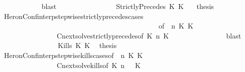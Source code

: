\begin{isabellebody}
\ \ \ \ \ \ \ \ \ \ \isamarkupfalse%
\ blast\isanewline
\ \ \ \ \ \ \isamarkupfalse%
\isanewline
\ \ \ \ \ \ \ \ \isamarkupfalse%
\ {\isacharparenleft}StrictlyPrecedes\ K{}\ K{}{\isacharparenright}\ \ \isamarkupfalse%
\ {\isacharquery}thesis\isanewline
\ \ \ \ \ \ \ \ \ \ \isamarkupfalse%
\ HeronConf{\isacharunderscore}interp{\isacharunderscore}stepwise{\isacharunderscore}strictly{\isacharunderscore}precedes{\isacharunderscore}cases\isanewline
\ \ \ \ \ \ \ \ \ \ \ \ \ \ \ \ \ \ \ \ \ \ \ \ \ \ \ \ \ \ \ \ \ \ \ \ \ \ \ \ \ \ \ \ \ {\isacharbrackleft}of\ {\isacartoucheopen}{\isasymGamma}{\isacartoucheclose}\ {\isacartoucheopen}n{\isacartoucheclose}\ {\isacartoucheopen}K{}{\isacartoucheclose}\ {\isacartoucheopen}K{}{\isacartoucheclose}\ {\isacartoucheopen}{\isasymPsi}{\isacartoucheclose}\ {\isacartoucheopen}{\isasymPhi}{\isacartoucheclose}{\isacharbrackright}\isanewline
\ \ \ \ \ \ \ \ \ \ \ \ \ \ \ \ Cnext{\isacharunderscore}solve{\isacharunderscore}strictly{\isacharunderscore}precedes{\isacharbrackleft}of\ {\isacartoucheopen}K{}{\isacartoucheclose}\ {\isacartoucheopen}n{\isacartoucheclose}\ {\isacartoucheopen}K{}{\isacartoucheclose}\ {\isacartoucheopen}{\isasymGamma}{\isacartoucheclose}\ {\isacartoucheopen}{\isasymPsi}{\isacartoucheclose}\ \ {\isacartoucheopen}{\isasymPhi}{\isacartoucheclose}{\isacharbrackright}\isanewline
\ \ \ \ \ \ \ \ \ \ \isamarkupfalse%
\ blast\isanewline
\ \ \ \ \ \ \isamarkupfalse%
\isanewline
\ \ \ \ \ \ \ \ \isamarkupfalse%
\ {\isacharparenleft}Kills\ K{}\ K{}{\isacharparenright}\ \isamarkupfalse%
\ {\isacharquery}thesis\isanewline
\ \ \ \ \ \ \ \ \ \ \isamarkupfalse%
\ HeronConf{\isacharunderscore}interp{\isacharunderscore}stepwise{\isacharunderscore}kills{\isacharunderscore}cases{\isacharbrackleft}of\ {\isacartoucheopen}{\isasymGamma}{\isacartoucheclose}\ {\isacartoucheopen}n{\isacartoucheclose}\ {\isacartoucheopen}K{}{\isacartoucheclose}\ {\isacartoucheopen}K{}{\isacartoucheclose}\ {\isacartoucheopen}{\isasymPsi}{\isacartoucheclose}\ {\isacartoucheopen}{\isasymPhi}{\isacartoucheclose}{\isacharbrackright}\isanewline
\ \ \ \ \ \ \ \ \ \ \ \ \ \ \ \ Cnext{\isacharunderscore}solve{\isacharunderscore}kills{\isacharbrackleft}of\ {\isacartoucheopen}K{}{\isacartoucheclose}\ {\isacartoucheopen}n{\isacartoucheclose}\ {\isacartoucheopen}{\isasymGamma}{\isacartoucheclose}\ {\isacartoucheopen}{\isasymPsi}{\isacartoucheclose}\ {\isacartoucheopen}K{}{\isacartoucheclose}\ {\isacartoucheopen}{\isasymPhi}{\isacartoucheclose}{\isacharbrackright}\ \isamarkupfalse%

\end{isabellebody}
